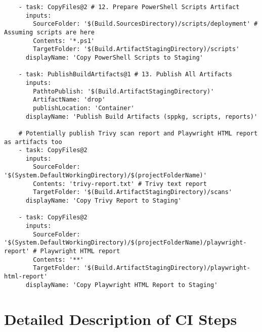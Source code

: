 \begin{framed}
\begin{verbatim}
    - task: CopyFiles@2 # 12. Prepare PowerShell Scripts Artifact
      inputs:
        SourceFolder: '$(Build.SourcesDirectory)/scripts/deployment' # Assuming scripts are here
        Contents: '*.ps1'
        TargetFolder: '$(Build.ArtifactStagingDirectory)/scripts'
      displayName: 'Copy PowerShell Scripts to Staging'

    - task: PublishBuildArtifacts@1 # 13. Publish All Artifacts
      inputs:
        PathtoPublish: '$(Build.ArtifactStagingDirectory)'
        ArtifactName: 'drop'
        publishLocation: 'Container'
      displayName: 'Publish Build Artifacts (sppkg, scripts, reports)'

    # Potentially publish Trivy scan report and Playwright HTML report as artifacts too
    - task: CopyFiles@2
      inputs:
        SourceFolder: '$(System.DefaultWorkingDirectory)/$(projectFolderName)'
        Contents: 'trivy-report.txt' # Trivy text report
        TargetFolder: '$(Build.ArtifactStagingDirectory)/scans'
      displayName: 'Copy Trivy Report to Staging'

    - task: CopyFiles@2
      inputs:
        SourceFolder: '$(System.DefaultWorkingDirectory)/$(projectFolderName)/playwright-report' # Playwright HTML report
        Contents: '**'
        TargetFolder: '$(Build.ArtifactStagingDirectory)/playwright-html-report'
      displayName: 'Copy Playwright HTML Report to Staging'
\end{verbatim}
\end{framed}

\section{Detailed Description of CI Steps}
\label{sec:CIDetailedSteps}

